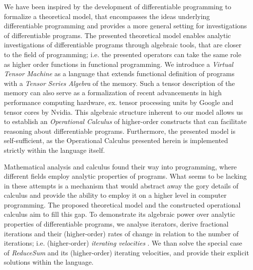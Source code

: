 We have been inspired by the development of differentiable programming to formalize a theoretical model, that encompasses the ideas underlying differentiable programming and provides a more general setting for investigations of differentiable programs. The presented theoretical model enables analytic investigations of differentiable programs through algebraic tools, that are closer to the field of programming; i.e. the presented operators can take the same role as higher order functions in functional programming. We introduce a \emph{Virtual Tensor Machine} as a language that extends functional definition of programs with a \emph{Tensor Series Algebra} of the memory. Such a tensor description of the memory can also serve as a formalization of recent advancements in high performance computing hardware, ex. tensor processing units by Google and tensor cores by Nvidia. This algebraic structure inherent to our model allows us to establish an \emph{Operational Calculus} of higher-order constructs that can facilitate reasoning about differentiable programs. Furthermore, the presented model is self-sufficient, as the Operational Calculus presented herein is implemented strictly within the language itself.

Mathematical analysis and calculus found their way into programming, where different fields employ analytic properties of programs. What seems to be lacking in these attempts is a mechanism that would abstract away the gory details of calculus and provide the ability to employ it on a higher level in computer programming. The proposed theoretical model and the constructed operational calculus aim to fill this gap. To demonstrate its algebraic power over analytic properties of differentiable programs, we analyse iterators, derive fractional iterations and their (higher-order) rates of change in relation to the number of iterations; i.e. (higher-order) \emph{ iterating velocities }. We than solve the special case of \emph{ReduceSum} and its (higher-order) iterating velocities, and provide their explicit solutions within the language.

